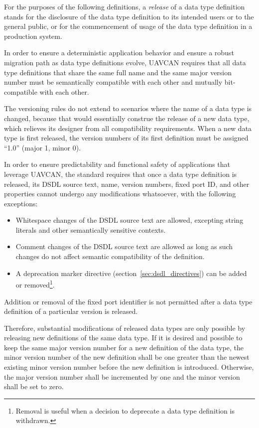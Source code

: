 For the purposes of the following definitions, a \emph{release} of a data type definition stands for
the disclosure of the data type definition to its intended users or to the general public,
or for the commencement of usage of the data type definition in a production system.

In order to ensure a deterministic application behavior and ensure a robust migration path
as data type definitions evolve, UAVCAN requires that all data type definitions that share the same
full name and the same major version number must be semantically compatible with each other
and mutually bit-compatible with each other.

The versioning rules do not extend to scenarios where the name of a data type is changed,
because that would essentially construe the release of a new data type,
which relieves its designer from all compatibility requirements.
When a new data type is first released,
the version numbers of its first definition must be assigned ``1.0'' (major 1, minor 0).

In order to ensure predictability and functional safety of applications that leverage UAVCAN,
the standard requires that once a data type definition is released,
its DSDL source text, name, version numbers, fixed port ID, and other properties cannot undergo any
modifications whatsoever, with the following exceptions:
\begin{itemize}
    \item Whitespace changes of the DSDL source text are allowed,
    excepting string literals and other semantically sensitive contexts.

    \item Comment changes of the DSDL source text are allowed as long as such changes
    do not affect semantic compatibility of the definition.

    \item A deprecation marker directive (section~\ref{sec:dsdl_directives}) can be added or removed\footnote{%
    Removal is useful when a decision to deprecate a data type definition is withdrawn.}.
\end{itemize}
Addition or removal of the fixed port identifier is not permitted after a data type definition
of a particular version is released.

Therefore, substantial modifications of released data types are only possible by releasing
new definitions of the same data type.
If it is desired and possible to keep the same major version number for a new definition of the data type,
the minor version number of the new definition shall be one greater than the newest existing minor version
number before the new definition is introduced.
Otherwise, the major version number shall be incremented by one and the minor version shall be set to zero.

